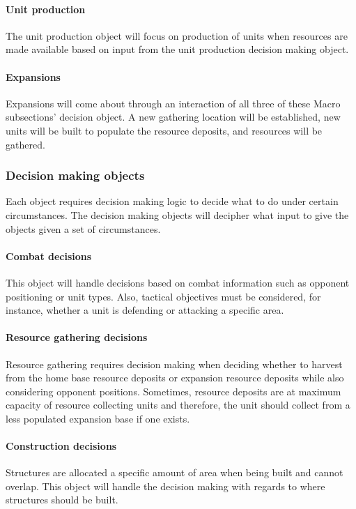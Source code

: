 \paragraph{Unit production}
The unit production object will focus on production of units when resources are made available based on input from the unit production decision making object. 

\paragraph{Expansions}
Expansions will come about through an interaction of all three of these Macro subsections' decision object. A new gathering location will be established, new units will be built to populate the resource deposits, and resources will be gathered.
\vspace{5mm}

\subsubsection{Decision making objects}
Each object requires decision making logic to decide what to do under certain circumstances. The decision making objects will decipher what input to give the objects given a set of circumstances.

\paragraph{Combat decisions}
This object will handle decisions based on combat information such as opponent positioning or unit types. Also, tactical objectives must be considered, for instance, whether a unit is defending or attacking a specific area.

\paragraph{Resource gathering decisions}
Resource gathering requires decision making when deciding whether to harvest from the home base resource deposits or expansion resource deposits while also considering opponent positions. Sometimes, resource deposits are at maximum capacity of resource collecting units and therefore, the unit should collect from a less populated expansion base if one exists.

\paragraph{Construction decisions}
Structures are allocated a specific amount of area when being built and cannot overlap. This object will handle the decision making with regards to where structures should be built. 

